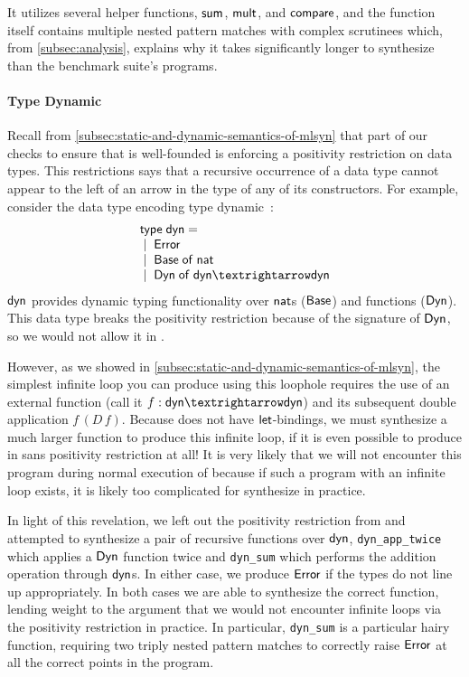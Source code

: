 It utilizes several helper functions, $\mathsf{sum}$, $\mathsf{mult}$, and $\mathsf{compare}$, and the function itself contains multiple nested pattern matches with complex scrutinees which, from \autoref{subsec:analysis}, explains why it takes significantly longer to synthesize than the benchmark suite's programs.

\paragraph{Type Dynamic}

Recall from \autoref{subsec:static-and-dynamic-semantics-of-mlsyn} that part of our checks to ensure that \mlsyn{} is well-founded is enforcing a positivity restriction on data types.
This restrictions says that a recursive occurrence of a data type cannot appear to the left of an arrow in the type of any of its constructors.
For example, consider the data type encoding type dynamic~:
\[
  \begin{array}{l}
    \mkwd{type}\;\mdyn = \\
    \bnfalt \mError \\
    \bnfalt \mBase\;\mof\;\mnat \\
    \bnfalt \mDyn\;\mof\;\mdyn → \mdyn
  \end{array}
\]
$\mathsf{dyn}$ provides dynamic typing functionality over $\mathsf{nat}$s ($\mathsf{Base}$) and functions ($\mathsf{Dyn}$).
This data type breaks the positivity restriction because of the signature of $\mathsf{Dyn}$, so we would not allow it in \mlsyn{}.

However, as we showed in \autoref{subsec:static-and-dynamic-semantics-of-mlsyn}, the simplest infinite loop you can produce using this loophole requires the use of an external function (call it $f : \mdyn → \mdyn$) and its subsequent double application $f\,(D\,f)$.
Because \mlsyn{} does not have $\mathsf{let}$-bindings, we must synthesize a much larger function to produce this infinite loop, if it is even possible to produce in \mlsyn{} sans positivity restriction at all!
It is very likely that we will not encounter this program during normal execution of \myth{} because if such a program with an infinite loop exists, it is likely too complicated for \myth{} synthesize in practice.

In light of this revelation, we left out the positivity restriction from \myth{} and attempted to synthesize a pair of recursive functions over $\mathsf{dyn}$, \texttt{dyn\_app\_twice} which applies a $\mathsf{Dyn}$ function twice and \texttt{dyn\_sum} which performs the addition operation through $\mathsf{dyn}$s.
In either case, we produce $\mathsf{Error}$ if the types do not line up appropriately.
In both cases we are able to synthesize the correct function, lending weight to the argument that we would not encounter infinite loops via the positivity restriction in practice.
In particular, \texttt{dyn\_sum} is a particular hairy function, requiring two triply nested pattern matches to correctly raise $\mathsf{Error}$ at all the correct points in the program.


